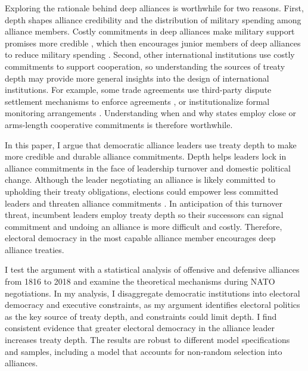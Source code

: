 \documentclass[12pt]{article}
\begin{document}
Exploring the rationale behind deep alliances is worthwhile for two reasons.
First, depth shapes alliance credibility and the distribution of military spending among alliance members. 
Costly commitments in deep alliances make military support promises more credible \citep{Morrow1994}, which then encourages junior members of deep alliances to reduce military spending \citep{Alley2020}.  
Second, other international institutions use costly commitments to support cooperation, so understanding the sources of treaty depth may provide more general insights into the design of international institutions.  
For example, some trade agreements use third-party dispute settlement mechanisms to enforce agreements \citep{Smith2000}, or institutionalize formal monitoring arrangements \citep{Duretal2013}.  
Understanding when and why states employ close or arms-length cooperative commitments is therefore worthwhile. 


In this paper, I argue that democratic alliance leaders use treaty depth to make more credible and durable alliance commitments. 
Depth helps leaders lock in alliance commitments in the face of leadership turnover and domestic political change. 
Although the leader negotiating an alliance is likely committed to upholding their treaty obligations, elections could empower less committed leaders and threaten alliance commitments \citep{GartzkeGleditsch2004, LeedsSavun2007, Leedsetal2009}.
In anticipation of this turnover threat, incumbent leaders employ treaty depth so their successors can signal commitment and undoing an alliance is more difficult and costly. 
Therefore, electoral democracy in the most capable alliance member encourages deep alliance treaties. 


I test the argument with a statistical analysis of offensive and defensive alliances from 1816 to 2018 and examine the theoretical mechanisms during NATO negotiations.
In my analysis, I disaggregate democratic institutions into electoral democracy and executive constraints, as my argument identifies electoral politics as the key source of treaty depth, and constraints could limit depth. 
I find consistent evidence that greater electoral democracy in the alliance leader increases treaty depth. 
The results are robust to different model specifications and samples, including a model that accounts for non-random selection into alliances. 
\end{document}
